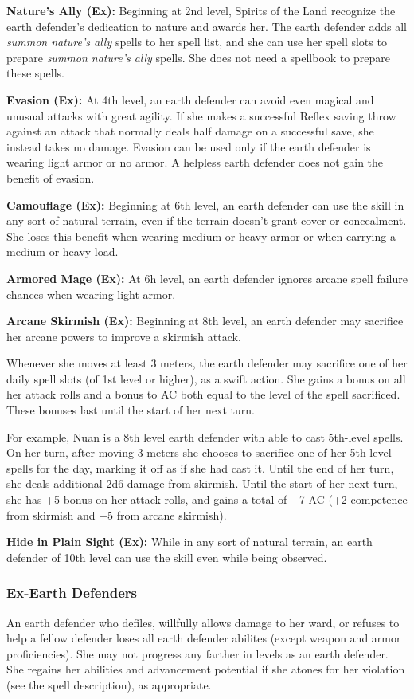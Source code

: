 {\textbf{Nature's Ally (Ex):} Beginning at 2nd level, Spirits of the Land recognize the earth defender's dedication to nature and awards her. The earth defender adds all \emph{summon nature's ally} spells to her spell list, and she can use her spell slots to prepare \emph{summon nature's ally} spells. She does not need a spellbook to prepare these spells.

\textbf{Evasion (Ex):} At 4th level, an earth defender can avoid even magical and unusual attacks with great agility. If she makes a successful Reflex saving throw against an attack that normally deals half damage on a successful save, she instead takes no damage. Evasion can be used only if the earth defender is wearing light armor or no armor. A helpless earth defender does not gain the benefit of evasion.

\textbf{Camouflage (Ex):} Beginning at 6th level, an earth defender can use the  skill in any sort of natural terrain, even if the terrain doesn't grant cover or concealment. She loses this benefit when wearing medium or heavy armor or when carrying a medium or heavy load.

\textbf{Armored Mage (Ex):} At 6h level, an earth defender ignores arcane spell failure chances when wearing light armor.

\textbf{Arcane Skirmish (Ex):} Beginning at 8th level, an earth defender may sacrifice her arcane powers to improve a skirmish attack.

Whenever she moves at least 3 meters, the earth defender may sacrifice one of her daily spell slots (of 1st level or higher), as a swift action. She gains a bonus on all her attack rolls and a bonus to AC both equal to the level of the spell sacrificed. These bonuses last until the start of her next turn.

For example, Nuan is a 8th level earth defender with able to cast 5th-level spells. On her turn, after moving 3 meters she chooses to sacrifice one of her 5th-level spells for the day, marking it off as if she had cast it. Until the end of her turn, she deals additional 2d6 damage from skirmish. Until the start of her next turn, she has +5 bonus on her attack rolls, and gains a total of +7 AC (+2 competence from skirmish and +5 from arcane skirmish).

\textbf{Hide in Plain Sight (Ex):} While in any sort of natural terrain, an earth defender of 10th level can use the  skill even while being observed.

\subsubsection{Ex-Earth Defenders}
An earth defender who defiles, willfully allows damage to her ward, or refuses to help a fellow defender loses all earth defender abilites (except weapon and armor proficiencies). She may not progress any farther in levels as an earth defender. She regains her abilities and advancement potential if she atones for her violation (see the  spell description), as appropriate.
}